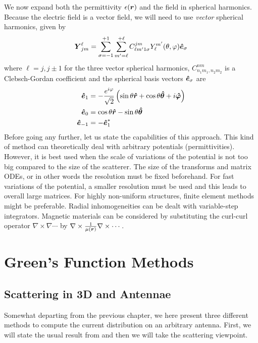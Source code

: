 We now expand both the permittivity $\epsilon(\boldsymbol{r})$ and the field in
spherical harmonics. Because the electric field is a vector field, 
we will need to use \textit{vector} spherical harmonics, given by
  \begin{equation}
    \boldsymbol{Y}_{jm}^\ell=\sum_{\sigma=-1}^{+1}\sum_{m'=\ell}^{+\ell}C^{jm}_{\ell m'1\sigma}Y_{\ell}^{m'}(\theta,\varphi)\boldsymbol{\hat{e}}_\sigma
  \end{equation}
where $\ell=j,j\pm1$ for the three vector spherical harmonics, $C^{nm}_{n_1m_1,n_2m_2}$
is a Clebsch-Gordan coefficient and the spherical basis vectors $\boldsymbol{\hat{e}}_\sigma$ 
are
  \begin{align}
    \boldsymbol{\hat{e}}_1	&= -\frac{e^{i\varphi}}{\sqrt{2}}\left(\sin\theta\boldsymbol{\hat{r}}+\cos\theta\boldsymbol{\hat{\theta}}+i\boldsymbol{\hat{\varphi}}\right)	\nonumber\\
    \boldsymbol{\hat{e}}_0	&= \cos\theta\boldsymbol{\hat{r}}-\sin\theta\boldsymbol{\hat{\theta}}								\\
    \boldsymbol{\hat{e}}_{-1}&= -\boldsymbol{\hat{e}}_1^*												\nonumber
  \end{align}
Before going any further, let us state the capabilities of this approach. This kind of method
can theoretically deal with arbitrary potentials (permittivities). However, it is best used
when the scale of variations of the potential is not too big compared to the size
of the scatterer. The size of the transforms and matrix ODEs, or in other words the resolution
must be fixed beforehand. For fast variations of the potential, a smaller resolution must be used
and this leads to overall large matrices. For highly non-uniform structures, finite element methods
might be preferable. Radial inhomogeneities can be dealt with variable-step integrators. 
Magnetic materials can be considered by substituting the curl-curl operator $\nabla\times\nabla\cdots$
by $\nabla\times\frac{1}{\mu(\boldsymbol{r})}\nabla\times\cdots$. 

\section{Green's Function Methods}\label{sec:app.basisEqn.greenFunction}

\subsection{Scattering in 3D and Antennae}
Somewhat departing from the previous chapter, we here present
three different methods to compute the current distribution on 
an arbitrary antenna. First, we will state the usual result 
from \cite{ELL2003} and then we will take the scattering viewpoint.

